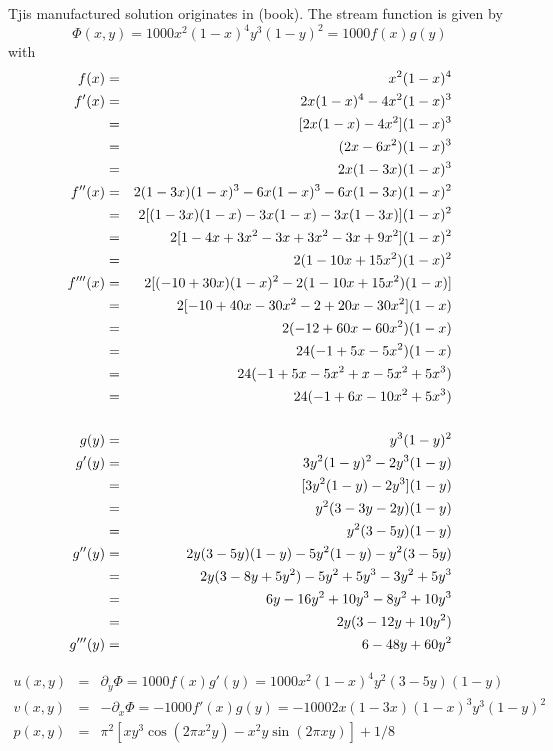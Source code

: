 
Tjis manufactured solution originates in \textcite{john16} (book).
The stream function is given by
\[
\Phi(x,y) = 1000x^2(1-x)^4 y^3 (1-y)^2 = 1000 f(x)g(y)
\]
with 
\begin{eqnarray}
f(x)&=& x^2(1-x)^4 \nonumber\\
f'(x) 
&=& 2x (1-x)^4 - 4x^2 (1-x)^3 \nonumber\\
&=& [2x(1-x) -4x^2] (1-x)^3 \nonumber\\
&=& (2x-6x^2) (1-x)^3 \nonumber\\
&=& 2x(1-3x) (1-x)^3 \nonumber\\
f''(x) 
&=& 2(1-3x)(1-x)^3 -6x (1-x)^3 -6x(1-3x)(1-x)^2 \nonumber\\
&=& 2[ (1-3x)(1-x) -3x(1-x) -3x(1-3x)  ] (1-x)^2 \nonumber\\
&=& 2[ 1-4x+3x^2 -3x+3x^2 -3x+9x^2 ] (1-x)^2 \nonumber\\
&=& 2(1-10x+15x^2)(1-x)^2 \nonumber\\
f'''(x)
&=& 2[(-10+30x)(1-x)^2 -2 (1-10x+15x^2)(1-x)] \nonumber\\
&=& 2[-10+40x-30x^2  -2+20x-30x^2 ](1-x) \nonumber\\
&=& 2(-12+60x-60x^2 )(1-x) \nonumber\\
&=& 24 (-1+5x-5x^2 )(1-x) \nonumber\\
&=& 24(-1+5x-5x^2+x-5x^2+5x^3) \nonumber\\
&=& 24(-1+6x-10x^2+5x^3 ) \nonumber\\
\nonumber\\
g(y) &=& y^3(1-y)^2 \nonumber\\
g'(y) 
&=& 3y^2(1-y)^2 -2y^3 (1-y) \nonumber\\
&=& [3y^2(1-y) -2y^3] (1-y) \nonumber\\
&=& y^2 (3-3y-2y) (1-y) \nonumber\\
&=& y^2 (3-5y) (1-y) \nonumber\\
g''(y) 
&=& 2y (3-5y) (1-y) -5y^2  (1-y) -y^2 (3-5y)  \nonumber\\
&=& 2y(3-8y+5y^2) -5y^2 + 5y^3 - 3y^2 + 5y^3 \nonumber\\
&=& 6y -16y^2 + 10y^3 -8y^2 +10y^3 \nonumber\\
&=& 2y(3 -12y+10y^2) \nonumber\\
g'''(y) 
&=& 6 - 48y +60y^2 \nonumber
\end{eqnarray}

\begin{eqnarray}
u(x,y) 
&=& \partial_y \Phi 
= 1000 f(x) g'(y) = 1000 x^2(1-x)^4  y^2 (3-5y) (1-y) \\
v(x,y) &=& -\partial_x \Phi 
= -1000 f'(x) g(y)  = -1000 2x(1-3x) (1-x)^3  y^3(1-y)^2   \\
p(x,y) &=& \pi^2 [xy^3 \cos(2\pi x^2 y) - x^2y \sin(2\pi xy) ]+1/8
\end{eqnarray}

